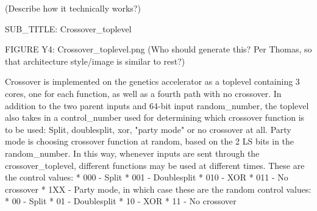 (Describe how it technically works?)

SUB\_TITLE: Crossover\_toplevel

FIGURE Y4: Crossover\_toplevel.png (Who should generate this? Per Thomas, so that architecture style/image is similar to rest?)

Crossover is implemented on the genetics accelerator as a toplevel containing 3 cores, one for each function, as well as a fourth path with no crossover. In addition to the two parent inputs and 64-bit input random\_number, the toplevel also takes in a control\_number used for determining which crossover function is to be used: Split, doublesplit, xor, "party mode" or no crossover at all. Party mode is choosing crossover function at random, based on the 2 LS bits in the random\_number. In this way, whenever inputs are sent through the crossover\_toplevel, different functions may be used at different times. These are the control values:
* 000 - Split
* 001 - Doublesplit
* 010 - XOR
* 011 - No crossover
* 1XX - Party mode, in which case these are the random control values:
    * 00 - Split
    * 01 - Doublesplit
    * 10 - XOR
    * 11 - No crossover